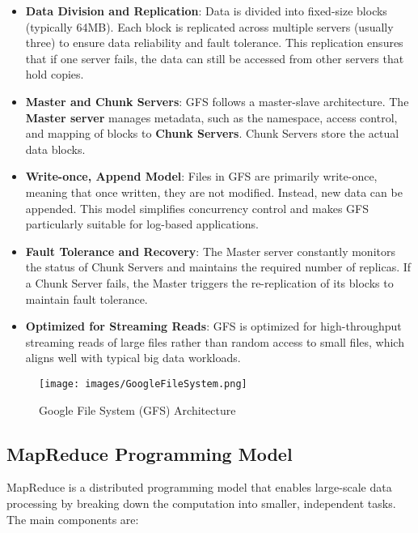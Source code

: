 \documentclass[12pt]{article}
\begin{document}
\begin{itemize}
    \item \textbf{Data Division and Replication}: Data is divided into fixed-size blocks (typically 64MB). Each block is replicated across multiple servers (usually three) to ensure data reliability and fault tolerance. This replication ensures that if one server fails, the data can still be accessed from other servers that hold copies.
    
    \item \textbf{Master and Chunk Servers}: GFS follows a master-slave architecture. The \textbf{Master server} manages metadata, such as the namespace, access control, and mapping of blocks to \textbf{Chunk Servers}. Chunk Servers store the actual data blocks.
    
    \item \textbf{Write-once, Append Model}: Files in GFS are primarily write-once, meaning that once written, they are not modified. Instead, new data can be appended. This model simplifies concurrency control and makes GFS particularly suitable for log-based applications.
    
    \item \textbf{Fault Tolerance and Recovery}: The Master server constantly monitors the status of Chunk Servers and maintains the required number of replicas. If a Chunk Server fails, the Master triggers the re-replication of its blocks to maintain fault tolerance.

    \item \textbf{Optimized for Streaming Reads}: GFS is optimized for high-throughput streaming reads of large files rather than random access to small files, which aligns well with typical big data workloads.
\end{itemize}

\begin{figure}[htbp]
    \centering
    \texttt{[image: images/GoogleFileSystem.png]}
    \caption{Google File System (GFS) Architecture}
    \label{fig:gfs}
\end{figure}

\subsection{MapReduce Programming Model}
MapReduce is a distributed programming model that enables large-scale data processing by breaking down the computation into smaller, independent tasks. The main components are:
\end{document}
